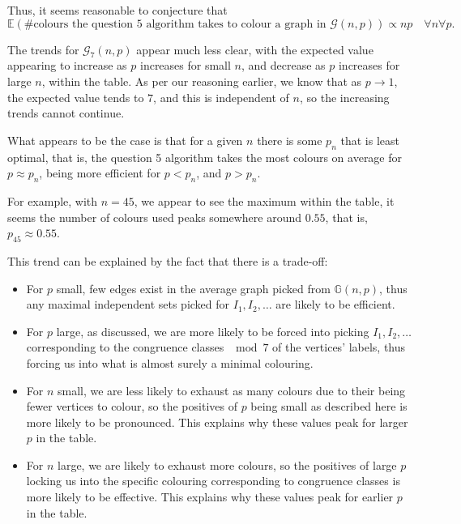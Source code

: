 \documentclass{article}
\begin{document}
Thus, it seems reasonable to conjecture that $$\mathbb{E}(\text{\#colours the question 5 algorithm takes to colour a graph in $\mathcal{G}(n,p)$}) \propto np \quad \forall n \forall p.$$

\begin{center}
	
\end{center}

The trends for $\mathcal{G}_7(n,p)$ appear much less clear, with the expected value appearing to increase as $p$ increases for small $n$, and decrease as $p$ increases for large $n$, within the table. As per our reasoning earlier, we know that as $p \to 1$, the expected value tends to $7$, and this is independent of $n$, so the increasing trends cannot continue.

What appears to be the case is that for a given $n$ there is some $p_n$ that is least optimal, that is, the question 5 algorithm takes the most colours on average for $p \approx p_n$, being more efficient for $p < p_n$, and $p > p_n$.

For example, with $n=45$, we appear to see the maximum within the table, it seems the number of colours used peaks somewhere around $0.55$, that is, $p_{45} \approx 0.55$.

This trend can be explained by the fact that there is a trade-off:

\begin{itemize}
	\item For $p$ small, few edges exist in the average graph picked from $\mathbb{G}(n,p)$, thus any maximal independent sets picked for $I_1, I_2, \dots$ are likely to be efficient.
	\item For $p$ large, as discussed, we are more likely to be forced into picking $I_1, I_2, \dots$ corresponding to the congruence classes $\mod 7$ of the vertices' labels, thus forcing us into what is almost surely a minimal colouring.
	\item For $n$ small, we are less likely to exhaust as many colours due to their being fewer vertices to colour, so the positives of $p$ being small as described here is more likely to be pronounced. This explains why these values peak for larger $p$ in the table.
	\item For $n$ large, we are likely to exhaust more colours, so the positives of large $p$ locking us into the specific colouring corresponding to congruence classes is more likely to be effective. This explains why these values peak for earlier $p$ in the table.
\end{itemize}
\end{document}

